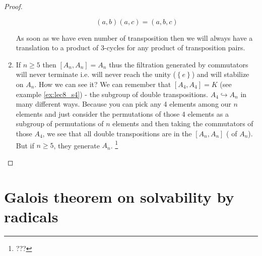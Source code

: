 \begin{theorem}[$S_n$ solvability]
\begin{proof}
\begin{enumerate}
{\begin{enumerate}
\[              (a,b)(a,c) = (a,b,c)
              \]
          \end{enumerate}
          As soon as we have even number of transposition then we will
          always have a translation to a product of 3-cycles for any
          product of transposition pairs.
        }
      \item If $n \ge 5$ then $\left[A_n, A_n\right] = A_n$ thus the
        filtration generated by commutators will never terminate
        i.e. will never reach the unity ($\left\{e\right\}$) and will
        stabilize on $A_n$. How we can see it? We can remember that
        $\left[A_4, A_4\right] = K$ (see example \ref{ex:lec8_s4}) -
        the subgroup of double transpositions. $A_4 \hookrightarrow
        A_n$ in many different ways. Because you can pick any 4
        elements among our $n$ elements and just consider the
        permutations of 
        those 4 elements as a subgroup of permutations of $n$
        elements and then taking the commutators of those $A_4$, we
        see that all double transpositions are in the $\left[A_n,
          A_n\right]$ ( of $A_n$). But
        if $n \ge 5$, they generate $A_n$.
        \footnote{
          ???
        }
    \end{enumerate}
  \end{proof}
  \label{thm:lec8_sn_solvability}
\end{theorem}

\section{Galois theorem on solvability by radicals}

